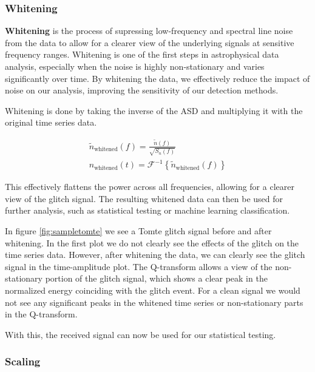 \documentclass[12pt]{article}
\begin{document}
\subsubsection{Whitening}\label{Whitening}

\textbf{Whitening} is the process of supressing low-frequency and spectral line noise from the data to allow for a clearer view of the underlying signals at sensitive frequency ranges. Whitening is one of the first steps in astrophysical data analysis, especially when the noise is highly non-stationary and varies significantly over time. By whitening the data, we effectively reduce the impact of noise on our analysis, improving the sensitivity of our detection methods.

\medskip
\noindent Whitening is done by taking the inverse of the ASD and multiplying it with the original time series data.

\begin{align}
    \tilde{n}_\text{whitened}(f) = \frac{\tilde{n}(f)}{\sqrt{S_n(f)}} \\
    n_\text{whitened}(t) = \mathcal{F}^{-1} \left\{ \tilde{n}_\text{whitened}(f) \right\}
    \label{eq:whitening}
\end{align}

\medskip
\noindent This effectively flattens the power across all frequencies, allowing for a clearer view of the glitch signal. The resulting whitened data can then be used for further analysis, such as statistical testing or machine learning classification.

\medskip
\noindent In figure \ref{fig:sampletomte} we see a Tomte glitch signal before and after whitening. In the first plot we do not clearly see the effects of the glitch on the time series data. However, after whitening the data, we can clearly see the glitch signal in the time-amplitude plot. The Q-transform allows a view of the non-stationary portion of the glitch signal, which shows a clear peak in the normalized energy coinciding with the glitch event. For a clean signal we would not see any significant peaks in the whitened time series or non-stationary parts in the Q-transform.

\medskip
\noindent With this, the received signal can now be used for our statistical testing.

\subsubsection{Scaling}\label{Scaling}
\end{document}
